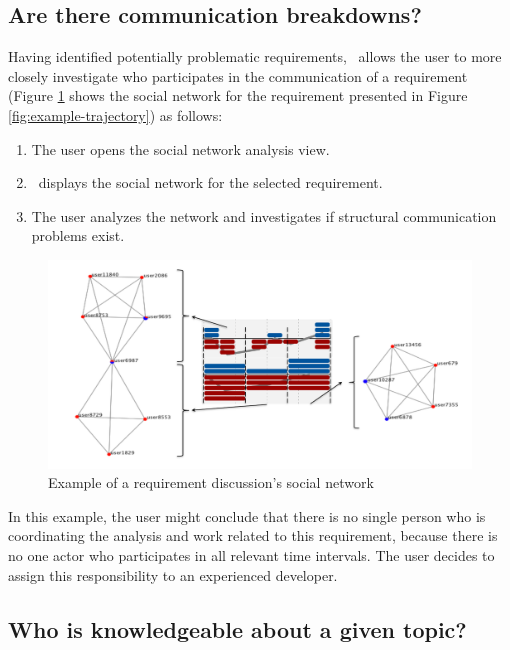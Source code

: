 \subsection{Are there communication breakdowns?}
Having identified potentially problematic requirements, \viss\  allows the user to more closely investigate who participates in the communication of a requirement (Figure \ref{fig:example-sn} shows the social network for the requirement presented in Figure \ref{fig:example-trajectory}) as follows:
\begin{enumerate}
\item The user opens the social network analysis view.
\item \viss\ displays the social network for the selected requirement.
\item The user analyzes the network and investigates if structural communication problems exist.
\end{enumerate}

\begin{figure}
\centering
\includegraphics[width=1\columnwidth]{img/example-sn2}
\caption{Example of a requirement discussion's social network}
\label{fig:example-sn}
\end{figure}

In this example, the user might conclude that there is no single person who is coordinating the analysis and work related to this requirement, because there is no one actor who participates in all relevant time intervals.
The user decides to assign this responsibility to an experienced developer.

\subsection{Who is knowledgeable about a given topic?}

